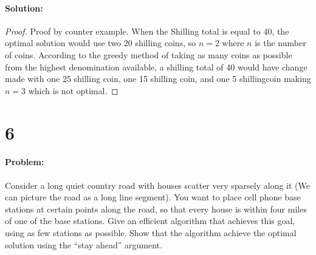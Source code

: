 \documentclass[12pt]{article}
\begin{document}
\paragraph{Solution:}
\begin{proof}
Proof by counter example.
When the Shilling total is equal to 40, the optimal solution would use two 20 shilling coins, so $n=2$ where $n$ is the number of coins.  According to the greedy method of taking as many coins as possible from the highest denomination available, a shilling total of 40 would have change made with one 25 shilling coin, one 15 shilling coin, and one 5 shillingcoin making $n=3$ which is not optimal.
\end{proof}

\section*{6}
\paragraph{Problem:}
Consider a long quiet country road with houses scatter very sparsely along
it (We can picture the road as a long line segment). You want to place cell
phone base stations at certain points along the road, so that every house
is within four miles of one of the base stations.
Give an efficient algorithm that achieves this goal, using as few stations
as possible. Show that the algorithm achieve the optimal solution using
the “stay ahead” argument.
\end{document}
